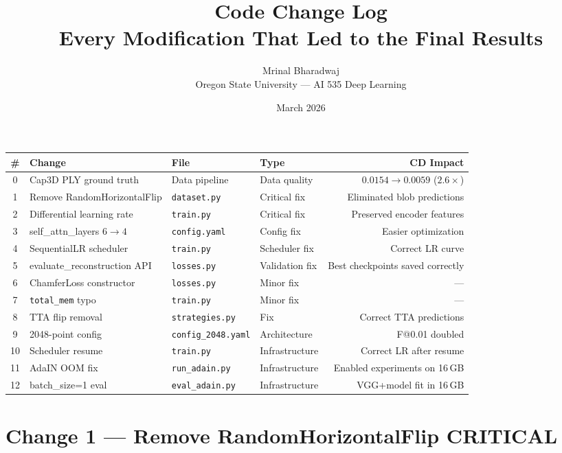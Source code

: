 \documentclass[10pt,a4paper]{article}
\title{\textbf{Code Change Log}\\[0.3em]
\large Every Modification That Led to the Final Results}
\author{Mrinal Bharadwaj\\Oregon State University --- AI 535 Deep Learning}
\date{March 2026}
\begin{document}
\maketitle
\thispagestyle{fancy}

\begin{center}
\small
\begin{tabular}{clllr}
\toprule
\textbf{\#} & \textbf{Change} & \textbf{File} & \textbf{Type} & \textbf{CD Impact} \\
\midrule
0  & Cap3D PLY ground truth & Data pipeline & Data quality & $0.0154 \to 0.0059$ ($2.6\times$) \\
1  & Remove RandomHorizontalFlip & \texttt{dataset.py} & Critical fix & Eliminated blob predictions \\
2  & Differential learning rate & \texttt{train.py} & Critical fix & Preserved encoder features \\
3  & self\_attn\_layers $6 \to 4$ & \texttt{config.yaml} & Config fix & Easier optimization \\
4  & SequentialLR scheduler & \texttt{train.py} & Scheduler fix & Correct LR curve \\
5  & evaluate\_reconstruction API & \texttt{losses.py} & Validation fix & Best checkpoints saved correctly \\
6  & ChamferLoss constructor & \texttt{losses.py} & Minor fix & --- \\
7  & \texttt{total\_mem} typo & \texttt{train.py} & Minor fix & --- \\
8  & TTA flip removal & \texttt{strategies.py} & Fix & Correct TTA predictions \\
9  & 2048-point config & \texttt{config\_2048.yaml} & Architecture & F@0.01 doubled \\
10 & Scheduler resume & \texttt{train.py} & Infrastructure & Correct LR after resume \\
11 & AdaIN OOM fix & \texttt{run\_adain.py} & Infrastructure & Enabled experiments on 16\,GB \\
12 & batch\_size=1 eval & \texttt{eval\_adain.py} & Infrastructure & VGG+model fit in 16\,GB \\
\bottomrule
\end{tabular}
\end{center}

\section*{Change 1 --- Remove RandomHorizontalFlip \hfill \normalfont\small\textcolor{bugred}{CRITICAL}}
\end{document}
